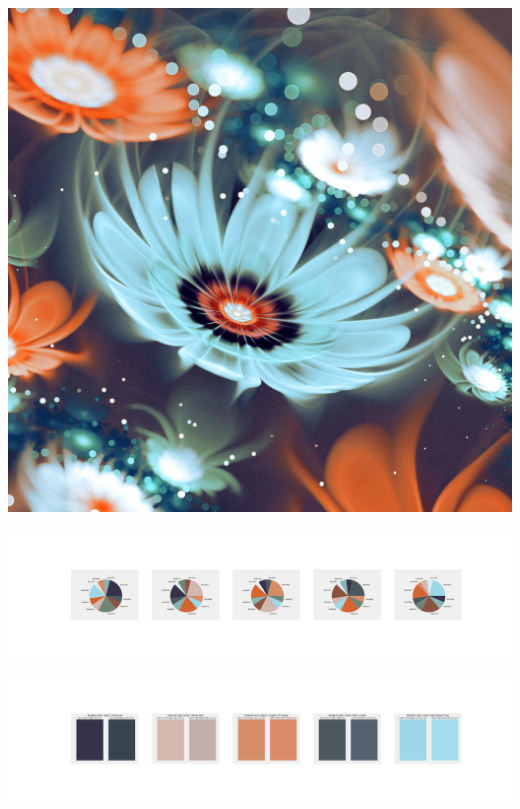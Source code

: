 \documentclass[11pt]{article}
\begin{document}
\begin{landscape}
    \begin{center}
    \includegraphics[width=\textwidth]{./nbimg/file (365).jpg}
    \end{center}

    \begin{center}
    \includegraphics[width=250mm]{./nbimg/pie-295.jpg}
    \end{center}

    \begin{center}
    \includegraphics[width=250mm]{./nbimg/peak-295.jpg}
    \end{center}
    


\end{landscape}
\end{document}
